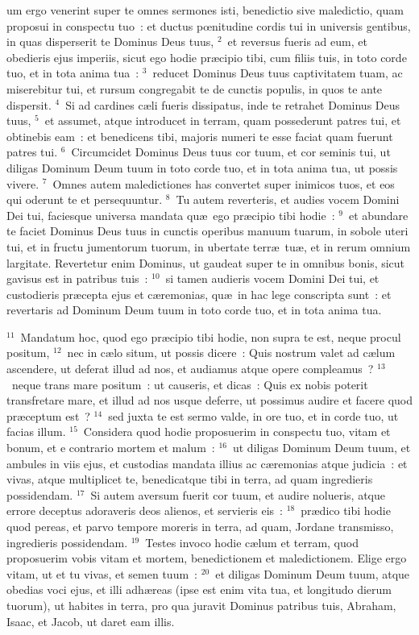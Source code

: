 \bchapter
{}um ergo venerint super te omnes sermones isti, benedictio sive maledictio, quam proposui in conspectu tuo~: et ductus pœnitudine cordis tui in universis gentibus, in quas disperserit te Dominus Deus tuus,
${}^{2}$~et reversus fueris ad eum, et obedieris ejus imperiis, sicut ego hodie pr\ae cipio tibi, cum filiis tuis, in toto corde tuo, et in tota anima tua~:
${}^{3}$~reducet Dominus Deus tuus captivitatem tuam, ac miserebitur tui, et rursum congregabit te de cunctis populis, in quos te ante dispersit.
${}^{4}$~Si ad cardines c\ae li fueris dissipatus, inde te retrahet Dominus Deus tuus,
${}^{5}$~et assumet, atque introducet in terram, quam possederunt patres tui, et obtinebis eam~: et benedicens tibi, majoris numeri te esse faciat quam fuerunt patres tui.
${}^{6}$~Circumcidet Dominus Deus tuus cor tuum, et cor seminis tui, ut diligas Dominum Deum tuum in toto corde tuo, et in tota anima tua, ut possis vivere.
${}^{7}$~Omnes autem maledictiones has convertet super inimicos tuos, et eos qui oderunt te et persequuntur.
${}^{8}$~Tu autem reverteris, et audies vocem Domini Dei tui, faciesque universa mandata qu\ae\ ego pr\ae cipio tibi hodie~:
${}^{9}$~et abundare te faciet Dominus Deus tuus in cunctis operibus manuum tuarum, in sobole uteri tui, et in fructu jumentorum tuorum, in ubertate terr\ae\ tu\ae , et in rerum omnium largitate. Revertetur enim Dominus, ut gaudeat super te in omnibus bonis, sicut gavisus est in patribus tuis~:
${}^{10}$~si tamen audieris vocem Domini Dei tui, et custodieris pr\ae cepta ejus et c\ae remonias, qu\ae\ in hac lege conscripta sunt~: et revertaris ad Dominum Deum tuum in toto corde tuo, et in tota anima tua.


${}^{11}$~Mandatum hoc, quod ego pr\ae cipio tibi hodie, non supra te est, neque procul positum,
${}^{12}$~nec in c\ae lo situm, ut possis dicere~: Quis nostrum valet ad c\ae lum ascendere, ut deferat illud ad nos, et audiamus atque opere compleamus~?
${}^{13}$~neque trans mare positum~: ut causeris, et dicas~: Quis ex nobis poterit transfretare mare, et illud ad nos usque deferre, ut possimus audire et facere quod pr\ae ceptum est~?
${}^{14}$~sed juxta te est sermo valde, in ore tuo, et in corde tuo, ut facias illum.
${}^{15}$~Considera quod hodie proposuerim in conspectu tuo, vitam et bonum, et e contrario mortem et malum~:
${}^{16}$~ut diligas Dominum Deum tuum, et ambules in viis ejus, et custodias mandata illius ac c\ae remonias atque judicia~: et vivas, atque multiplicet te, benedicatque tibi in terra, ad quam ingredieris possidendam.
${}^{17}$~Si autem aversum fuerit cor tuum, et audire nolueris, atque errore deceptus adoraveris deos alienos, et servieris eis~:
${}^{18}$~pr\ae dico tibi hodie quod pereas, et parvo tempore moreris in terra, ad quam, Jordane transmisso, ingredieris possidendam.
${}^{19}$~Testes invoco hodie c\ae lum et terram, quod proposuerim vobis vitam et mortem, benedictionem et maledictionem. Elige ergo vitam, ut et tu vivas, et semen tuum~:
${}^{20}$~et diligas Dominum Deum tuum, atque obedias voci ejus, et illi adh\ae reas (ipse est enim vita tua, et longitudo dierum tuorum), ut habites in terra, pro qua juravit Dominus patribus tuis, Abraham, Isaac, et Jacob, ut daret eam illis.

